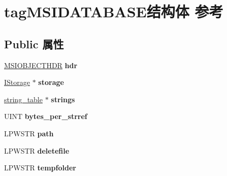 \hypertarget{structtag_m_s_i_d_a_t_a_b_a_s_e}{}\section{tag\+M\+S\+I\+D\+A\+T\+A\+B\+A\+S\+E结构体 参考}
\label{structtag_m_s_i_d_a_t_a_b_a_s_e}
\subsection*{Public 属性}
\begin{DoxyCompactItemize}
\item 
\mbox{\label{structtag_m_s_i_d_a_t_a_b_a_s_e_a65adb49794b7eb57eaadae8dbe16f474}} 
\hyperlink{structtag_m_s_i_o_b_j_e_c_t_h_d_r}{M\+S\+I\+O\+B\+J\+E\+C\+T\+H\+DR} {\bfseries hdr}
\item 
\mbox{\label{structtag_m_s_i_d_a_t_a_b_a_s_e_a94974a5d5851efa760643c7976324668}} 
\hyperlink{interface_i_storage}{I\+Storage} $\ast$ {\bfseries storage}
\item 
\mbox{\label{structtag_m_s_i_d_a_t_a_b_a_s_e_ab6771f3e7aa0878b454bf5c929d9ab8f}} 
\hyperlink{structstring__table}{string\+\_\+table} $\ast$ {\bfseries strings}
\item 
\mbox{\label{structtag_m_s_i_d_a_t_a_b_a_s_e_a1931c7d16182fdf34e95e6c970dd6b9f}} 
U\+I\+NT {\bfseries bytes\+\_\+per\+\_\+strref}
\item 
\mbox{\label{structtag_m_s_i_d_a_t_a_b_a_s_e_ab99a77f6de9a5e4130d37f4101adf5e0}} 
L\+P\+W\+S\+TR {\bfseries path}
\item 
\mbox{\label{structtag_m_s_i_d_a_t_a_b_a_s_e_a86a01d26eb6ec7a87a7dbdf01206c901}} 
L\+P\+W\+S\+TR {\bfseries deletefile}
\item 
\mbox{\label{structtag_m_s_i_d_a_t_a_b_a_s_e_aae85a3576394c45aa272e9330344af13}} 
L\+P\+W\+S\+TR {\bfseries tempfolder}
\item 
\mbox{\label{structtag_m_s_i_d_a_t_a_b_a_s_e_adaa84c28a6274eed1cdb79041ec99079}} 

\end{DoxyCompactItemize}
